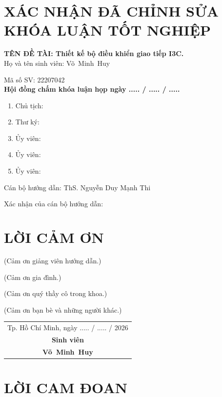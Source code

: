 \documentclass[twoside,a4paper,14pt,openright]{extreport}
\newcommand{\tenSV}{Võ~Minh~Huy}
\newcommand{\mssv}{22207042}
\newcommand{\tenGVHD}{ThS. Nguyễn Duy Mạnh Thi}
\begin{document}

\chapter*{XÁC NHẬN ĐÃ CHỈNH SỬA KHÓA LUẬN TỐT NGHIỆP}

{\textbf{TÊN ĐỀ TÀI: Thiết kế bộ điều khiển giao tiếp I3C.}}\\[.1 cm]

Họ và tên sinh viên: \tenSV

Mã số SV: \mssv \\[.1 cm]

\textbf{Hội đồng chấm khóa luận họp ngày ..... / ..... / .....}

\begin{enumerate}
	\item Chủ tịch:
	\item Thư ký:
	\item Ủy viên:
	\item Ủy viên:
	\item Ủy viên:
\end{enumerate}

\vspace{.2 cm}
Cán bộ hướng dẫn: \tenGVHD

Xác nhận của cán bộ hướng dẫn:

\chapter*{LỜI CẢM ƠN}

(Cảm ơn giảng viên hướng dẫn.)

(Cảm ơn gia đình.)

(Cảm ơn quý thầy cô trong khoa.)

(Cảm ơn bạn bè và những người khác.)

\vspace{1cm}
\begin{flushright}
\begin{tabular}{c}
Tp. Hồ Chí Minh, ngày ..... / ..... / 2026\\[0.5cm]
\textbf{Sinh viên}\\[2cm]
\textbf{\tenSV}
\end{tabular}
\end{flushright}

\chapter*{LỜI CAM ĐOAN}
\end{document}
